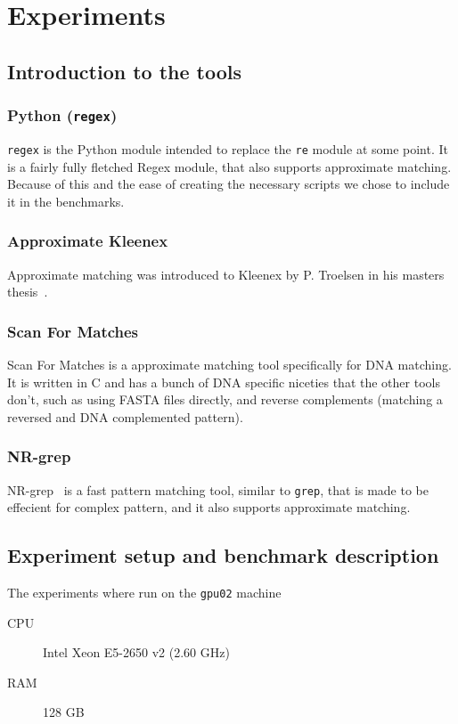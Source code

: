 \section{Experiments}

\subsection{Introduction to the tools}
\subsubsection{Python (\texttt{regex})}
\texttt{regex} is the Python module intended to replace the \texttt{re} module
at some point. It is a fairly fully fletched Regex module, that also supports
approximate matching. Because of this and the ease of creating the necessary
scripts we chose to include it in the benchmarks.

\subsubsection{Approximate Kleenex}
Approximate matching was introduced to Kleenex by P. Troelsen in his masters
thesis~\cite{troelsen2016approximate}.

\subsubsection{Scan For Matches}
Scan For Matches is a approximate matching tool specifically for DNA matching.
It is written in C and has a bunch of DNA specific niceties that the other
tools don't, such as using FASTA files directly, and reverse complements
(matching a reversed and DNA complemented pattern).

\subsubsection{NR-grep}
NR-grep~\cite{navarro2001nr} is a fast pattern matching tool, similar to
\texttt{grep}, that is made to be effecient for complex pattern, and it also
supports approximate matching.


\subsection{Experiment setup and benchmark description}
The experiments where run on the \texttt{gpu02} machine
\begin{description}
    \item[CPU] Intel Xeon E5-2650 v2 (2.60 GHz)
    \item[RAM] 128 GB
\end{description}

